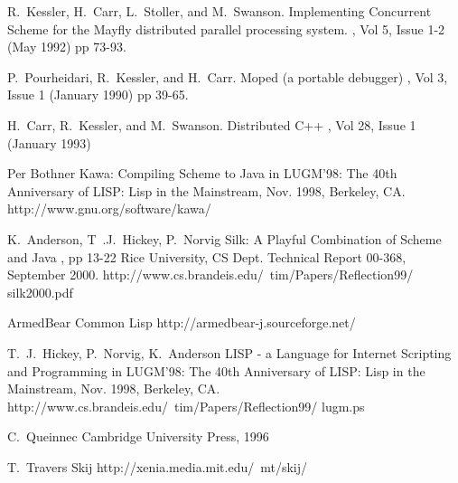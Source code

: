 \documentclass[final]{ieee}
\begin{document}



\begin{thebibliography}{1}

 R.~Kessler, H.~Carr, L.~Stoller, and M.~Swanson.
\newblock Implementing Concurrent Scheme for the Mayfly distributed
parallel processing system.  , Vol 5, Issue 1-2 (May 1992) pp 73-93.

P.~Pourheidari, R.~Kessler, and H.~Carr.
\newblock Moped (a portable debugger)
, Vol 3, Issue 1 (January 1990) pp 39-65.

H.~Carr, R.~Kessler, and M.~Swanson.
\newblock Distributed C++
, Vol 28, Issue 1 (January 1993)

Per Bothner
\newblock Kawa: Compiling Scheme to Java
\newblock in LUGM'98: The 40th Anniversary of LISP: Lisp in the Mainstream, Nov. 1998, Berkeley, CA.
\newblock http://www.gnu.org/software/kawa/

K.~Anderson, T~.J.~Hickey, P.~Norvig
\newblock Silk: A Playful Combination of Scheme and Java
 , pp 13-22
\newblock Rice University, CS Dept. Technical Report 00-368, September 2000.
\newblock http://www.cs.brandeis.edu/~tim/Papers/Reflection99/ silk2000.pdf

\newblock ArmedBear Common Lisp
\newblock http://armedbear-j.sourceforge.net/


T.~J.~Hickey, P.~Norvig, K.~Anderson
\newblock LISP - a Language for Internet Scripting and Programming
\newblock in LUGM'98: The 40th Anniversary of LISP: Lisp in the Mainstream, Nov. 1998, Berkeley, CA.
\newblock http://www.cs.brandeis.edu/~tim/Papers/Reflection99/ lugm.ps

C.~Queinnec
\newblock Cambridge University Press, 1996

T.~Travers
\newblock Skij
\newblock http://xenia.media.mit.edu/~mt/skij/


\end{thebibliography}
\end{document}
